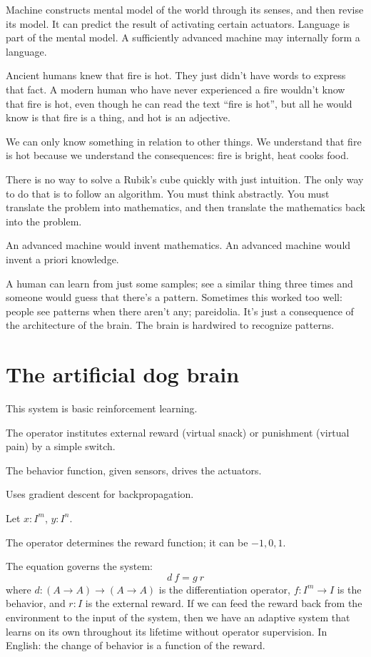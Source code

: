 Machine constructs mental model of the world through its senses,
and then revise its model.
It can predict the result of activating certain actuators.
Language is part of the mental model.
A sufficiently advanced machine may internally form a language.

Ancient humans knew that fire is hot.
They just didn't have words to express that fact.
A modern human who have never experienced a fire
wouldn't know that fire is hot,
even though he can read the text ``fire is hot'',
but all he would know is that fire is a thing, and hot is an adjective.

We can only know something in relation to other things.
We understand that fire is hot because we understand the consequences:
fire is bright, heat cooks food.

There is no way to solve a Rubik's cube quickly with just intuition.
The only way to do that is to follow an algorithm.
You must think abstractly.
You must translate the problem into mathematics,
and then translate the mathematics back into the problem.

An advanced machine would invent mathematics.
An advanced machine would invent a priori knowledge.

A human can learn from just some samples;
see a similar thing three times and someone would guess that there's a pattern.
Sometimes this worked too well: people see patterns when there aren't any;
pareidolia.
It's just a consequence of the architecture of the brain.
The brain is hardwired to recognize patterns.

\section{The artificial dog brain}

This system is basic reinforcement learning.

The operator institutes external reward
(virtual snack) or punishment (virtual pain)
by a simple switch.

The behavior function, given sensors, drives the actuators.

Uses gradient descent for backpropagation.

Let \( x : I^m \), \( y : I^n \).

The operator determines the reward function;
it can be \(-1,0,1\).

The equation governs the system:
\[
    d~f = g~r
\]
where \(d : (A \to A) \to (A \to A)\) is the differentiation operator,
\( f : I^m \to I \) is the behavior,
and \( r : I \) is the external reward.
If we can feed the reward back from
the environment to the input of the system,
then we have an adaptive system that
learns on its own throughout its lifetime without operator supervision.
In English: the change of behavior is a function of the reward.

